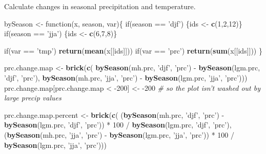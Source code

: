 \documentclass[11pt,]{tufte-handout}
\newenvironment{Shaded}{}{}
\newcommand{\KeywordTok}[1]{\textcolor[rgb]{0.00,0.44,0.13}{\textbf{{#1}}}}
\newcommand{\DecValTok}[1]{\textcolor[rgb]{0.25,0.63,0.44}{{#1}}}
\newcommand{\StringTok}[1]{\textcolor[rgb]{0.25,0.44,0.63}{{#1}}}
\newcommand{\CommentTok}[1]{\textcolor[rgb]{0.38,0.63,0.69}{\textit{{#1}}}}
\newcommand{\NormalTok}[1]{{#1}}
\begin{document}
Calculate changes in seasonal precipitation and temperature.

\begin{Shaded}
\begin{Highlighting}[]
\NormalTok{bySeason <-}\StringTok{ }\NormalTok{function(x, season, var)\{}
  \NormalTok{if(season ==}\StringTok{ 'djf'}\NormalTok{) \{ids <-}\StringTok{ }\KeywordTok{c}\NormalTok{(}\DecValTok{1}\NormalTok{,}\DecValTok{2}\NormalTok{,}\DecValTok{12}\NormalTok{)\}}
  \NormalTok{if(season ==}\StringTok{ 'jja'}\NormalTok{) \{ids <-}\StringTok{ }\KeywordTok{c}\NormalTok{(}\DecValTok{6}\NormalTok{,}\DecValTok{7}\NormalTok{,}\DecValTok{8}\NormalTok{)\}}
  
  \NormalTok{if(var ==}\StringTok{ 'tmp'}\NormalTok{) }\KeywordTok{return}\NormalTok{(}\KeywordTok{mean}\NormalTok{(x[[ids]]))}
  \NormalTok{if(var ==}\StringTok{ 'prc'}\NormalTok{) }\KeywordTok{return}\NormalTok{(}\KeywordTok{sum}\NormalTok{(x[[ids]]))}
\NormalTok{\}}

\NormalTok{prc.change.map <-}\StringTok{ }\KeywordTok{brick}\NormalTok{(}\KeywordTok{c}\NormalTok{(}
  \KeywordTok{bySeason}\NormalTok{(mh.prc, }\StringTok{'djf'}\NormalTok{, }\StringTok{'prc'}\NormalTok{) -}\StringTok{ }\KeywordTok{bySeason}\NormalTok{(lgm.prc, }\StringTok{'djf'}\NormalTok{, }\StringTok{'prc'}\NormalTok{),}
  \KeywordTok{bySeason}\NormalTok{(mh.prc, }\StringTok{'jja'}\NormalTok{, }\StringTok{'prc'}\NormalTok{) -}\StringTok{ }\KeywordTok{bySeason}\NormalTok{(lgm.prc, }\StringTok{'jja'}\NormalTok{, }\StringTok{'prc'}\NormalTok{)))}
\NormalTok{prc.change.map[prc.change.map <}\StringTok{ }\NormalTok{-}\DecValTok{200}\NormalTok{] <-}\StringTok{ }\NormalTok{-}\DecValTok{200} \CommentTok{# so the plot isn't washed out by large precip values}


\NormalTok{prc.change.map.percent <-}\StringTok{ }\KeywordTok{brick}\NormalTok{(}\KeywordTok{c}\NormalTok{(}
  \NormalTok{(}\KeywordTok{bySeason}\NormalTok{(mh.prc, }\StringTok{'djf'}\NormalTok{, }\StringTok{'prc'}\NormalTok{) -}\StringTok{ }\KeywordTok{bySeason}\NormalTok{(lgm.prc, }\StringTok{'djf'}\NormalTok{, }\StringTok{'prc'}\NormalTok{)) *}\StringTok{ }\DecValTok{100} \NormalTok{/}\StringTok{ }\KeywordTok{bySeason}\NormalTok{(lgm.prc, }\StringTok{'djf'}\NormalTok{, }\StringTok{'prc'}\NormalTok{), }
  \NormalTok{(}\KeywordTok{bySeason}\NormalTok{(mh.prc, }\StringTok{'jja'}\NormalTok{, }\StringTok{'prc'}\NormalTok{) -}\StringTok{ }\KeywordTok{bySeason}\NormalTok{(lgm.prc, }\StringTok{'jja'}\NormalTok{, }\StringTok{'prc'}\NormalTok{)) *}\StringTok{ }\DecValTok{100} \NormalTok{/}\StringTok{ }\KeywordTok{bySeason}\NormalTok{(lgm.prc, }\StringTok{'jja'}\NormalTok{, }\StringTok{'prc'}\NormalTok{)))}


\end{Highlighting}
\end{Shaded}
\end{document}
